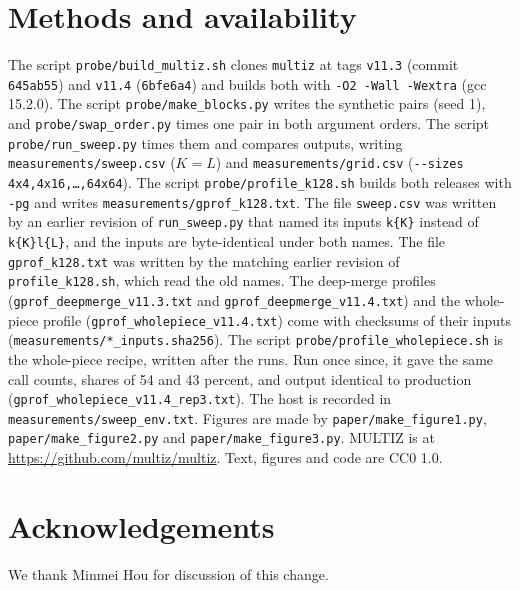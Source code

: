 \documentclass[11pt,letterpaper]{article}
\newcommand{\code}[1]{\texttt{#1}}
\begin{document}
\section*{Methods and availability}

The script \code{probe/build\_multiz.sh} clones \code{multiz} at tags \code{v11.3} (commit \code{645ab55}) and
\code{v11.4} (\code{6bfe6a4}) and builds both with \code{-O2 -Wall -Wextra} (gcc 15.2.0). The script
\code{probe/make\_blocks.py} writes the synthetic pairs (seed 1), and \code{probe/swap\_order.py} times one pair in both
argument orders. The script \code{probe/run\_sweep.py} times them and
compares outputs, writing \code{measurements/sweep.csv} ($K = L$) and \code{measurements/grid.csv}
(\code{-{}-sizes 4x4,4x16,\ldots,64x64}). The script \code{probe/profile\_k128.sh} builds both releases with
\code{-pg} and writes \code{measurements/gprof\_k128.txt}. The file \code{sweep.csv} was written by an earlier
revision of \code{run\_sweep.py} that named its inputs \code{k\{K\}} instead of \code{k\{K\}l\{L\}}, and the inputs
are byte-identical under both names. The file \code{gprof\_k128.txt} was written by the matching earlier revision of
\code{profile\_k128.sh}, which read the old names. The deep-merge profiles (\code{gprof\_deepmerge\_v11.3.txt} and
\code{gprof\_deepmerge\_v11.4.txt}) and the whole-piece profile (\code{gprof\_wholepiece\_v11.4.txt}) come with
checksums of their inputs (\code{measurements/*\_inputs.sha256}). The script \code{probe/profile\_wholepiece.sh} is
the whole-piece recipe, written after the runs. Run once since, it gave the same call counts, shares of 54 and 43 percent, and output identical to production (\code{gprof\_wholepiece\_v11.4\_rep3.txt}). The host is recorded in \code{measurements/sweep\_env.txt}. Figures are made by
\code{paper/make\_figure1.py}, \code{paper/make\_figure2.py} and \code{paper/make\_figure3.py}. MULTIZ is at
\url{https://github.com/multiz/multiz}. Text, figures and code are CC0 1.0.

\section*{Acknowledgements}

We thank Minmei Hou for discussion of this change.
\end{document}
